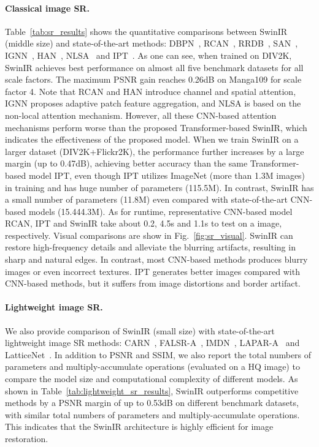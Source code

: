 \documentclass[10pt,twocolumn,letterpaper]{article}
\newlength \g
\begin{document}
\vspace{-2mm}
\paragraph{Classical image SR.}
Table~\ref{tab:sr_results} shows the quantitative comparisons between SwinIR (middle size) and state-of-the-art methods: DBPN~\cite{haris2018DBPN}, RCAN~\cite{zhang2018rcan}, RRDB~\cite{wang2018esrgan}, SAN~\cite{dai2019SAN}, IGNN~\cite{zhou2020IGNN}, HAN~\cite{niu2020HAN}, NLSA~\cite{mei2021NLSA} and IPT~\cite{chen2021IPT}. As one can see, when trained on DIV2K, SwinIR achieves best performance on almost all five benchmark datasets for all scale factors. The maximum PSNR gain reaches 0.26dB on Manga109 for scale factor 4. Note that RCAN and HAN introduce channel and spatial attention, IGNN proposes adaptive patch feature aggregation, and NLSA is based on the non-local attention mechanism. However, all these CNN-based attention mechanisms perform worse than the proposed Transformer-based SwinIR, which indicates the effectiveness of the proposed model.
When we train SwinIR on a larger dataset (DIV2K+Flickr2K), the performance further increases by a large margin
(up to 0.47dB), achieving better accuracy than the same Transformer-based model IPT, even though IPT utilizes ImageNet (more than 1.3M images) in training and has huge number of parameters (115.5M). In contrast, SwinIR has a small number of parameters (11.8M) even compared with state-of-the-art CNN-based models (15.444.3M). As for runtime, representative CNN-based model RCAN, IPT and SwinIR take about 0.2, 4.5s and 1.1s to test on a  image, respectively. Visual comparisons are show in Fig.~\ref{fig:sr_visual}. SwinIR can restore high-frequency details and alleviate the blurring artifacts, resulting in sharp and natural edges. In contrast, most CNN-based methods produces blurry images or even incorrect textures. IPT generates better images compared with CNN-based methods, but it suffers from image distortions and border artifact.





\vspace{-4mm}
\paragraph{Lightweight image SR.} We also provide comparison of SwinIR (small size) with state-of-the-art lightweight image SR methods: CARN~\cite{ahn2018CARN}, FALSR-A~\cite{chu2021fast}, IMDN~\cite{hui2019imdn}, LAPAR-A~\cite{li2021lapar} and LatticeNet~\cite{luo2020latticenet}. In addition to PSNR and SSIM, we also report the total numbers of parameters and multiply-accumulate operations (evaluated on a  HQ image) to compare the model size and computational complexity of different models. As shown in Table~\ref{tab:lightweight_sr_results}, SwinIR outperforms competitive methods by a PSNR margin of up to 0.53dB on different benchmark datasets, with similar total numbers of parameters and multiply-accumulate operations. This indicates that the SwinIR architecture is highly efficient for image restoration.
\end{document}
